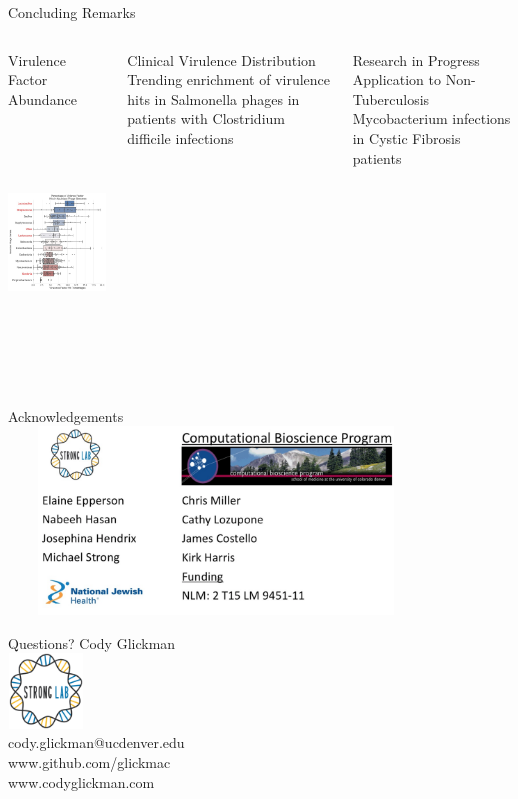 \documentclass[11pt]{beamer}
\begin{document}
	\begin{frame}{Concluding Remarks}
	\begin{columns}
	\begin{block}{Virulence Factor Abundance}
	\includegraphics[height=7cm, width=6cm]{Top_Phages_Plots.jpg}
	\end{block}
	\begin{block}{Clinical Virulence Distribution}
	Trending enrichment of virulence hits in Salmonella phages in patients with Clostridium difficile infections
	\end{block}
	\begin{block}{Research in Progress}
	Application to Non-Tuberculosis Mycobacterium infections in Cystic Fibrosis patients
	\end{block}
	
	\end{columns}
	
	\end{frame}
	
	
	
	\begin{frame}{Acknowledgements}
	\centering
	{\includegraphics[height=5cm, width=11cm]{Acknowledgements.png} }
	\end{frame}
	
	\begin{frame}{Questions?}
	\center
	Cody Glickman \\ \includegraphics[height=2cm, width=2cm]{lablogo.png} \\ cody.glickman@ucdenver.edu \\ \alert{www.github.com/glickmac} \\ www.codyglickman.com
	\end{frame}
\end{document}
